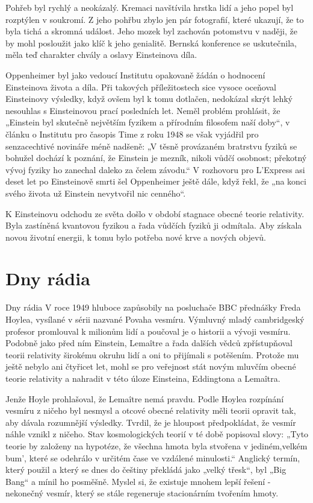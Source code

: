   Pohřeb byl rychlý a neokázalý. Kremaci navštívila hrstka lidí a jeho popel byl rozptýlen v
  soukromí. Z jeho pohřbu zbylo jen pár fotografií, které ukazují, že to byla tichá a skromná
  událost. Jeho mozek byl zachován potomstvu v naději, že by mohl posloužit jako klíč k jeho
  genialitě. Bernská konference se uskutečnila, měla teď charakter chvály a oslavy Einsteinova díla.
  
  Oppenheimer byl jako vedoucí Institutu opakovaně žádán o hodnocení Einsteinova života a díla. Při
  takových příležitostech sice vysoce oceňoval Einsteinovy výsledky, když ovšem byl k tomu dotlačen,
  nedokázal skrýt lehký nesouhlas s Einsteinovou prací posledních let. Neměl problém prohlásit, že
  „Einstein byl skutečně největším fyzikem a přírodním filosofem naší doby“, v článku o Institutu
  pro časopis Time z roku 1948 se však vyjádřil pro senzacechtivé novináře méně nadšeně: „V těsně
  provázaném bratrstvu fyziků se bohužel dochází k poznání, že Einstein je mezník, nikoli vůdčí
  osobnost; překotný vývoj fyziky ho zanechal daleko za čelem závodu.“ V rozhovoru pro L’Express asi
  deset let po Einsteinově smrti šel Oppenheimer ještě dále, když řekl, že „na konci svého života už
  Einstein nevytvořil nic cenného“. 
  
  K Einsteinovu odchodu ze světa došlo v období stagnace obecné teorie relativity. Byla zastíněná
  kvantovou fyzikou a řada vůdčích fyziků ji odmítala. Aby získala novou životní energii, k tomu
  bylo potřeba nové krve a nových objevů.

\section{Dny rádia}\label{feyIchIIIsecVII}
  Dny rádia V roce 1949 hluboce zapůsobily na posluchače BBC přednášky Freda Hoylea, vysílané v
  sérii nazvané Povaha vesmíru. Výmluvný mladý cambridgeský profesor promlouval k milionům lidí a
  poučoval je o historii a vývoji vesmíru. Podobně jako před ním Einstein, Lemaître a řada dalších
  vědců zpřístupňoval teorii relativity širokému okruhu lidí a oni to přijímali s potěšením. Protože
  mu ještě nebylo ani čtyřicet let, mohl se pro veřejnost stát novým mluvčím obecné teorie
  relativity a nahradit v této úloze Einsteina, Eddingtona a Lemaîtra. 

  Jenže Hoyle prohlašoval, že Lemaître nemá pravdu. Podle Hoylea rozpínání vesmíru z ničeho byl
  nesmysl a otcové obecné relativity měli teorii opravit tak, aby dávala rozumnější výsledky.
  Tvrdil, že je hloupost předpokládat, že vesmír náhle vznikl z ničeho. Stav kosmologických teorií v
  té době popisoval slovy: „Tyto teorie by založeny na hypotéze, že všechna hmota byla stvořena v
  jediném,velkém bum', které se odehrálo v určitém čase ve vzdálené minulosti.“ Anglický termín,
  který použil a který se dnes do češtiny překládá jako „velký třesk“, byl „Big Bang“ a mínil ho
  posměšně. Myslel si, že existuje mnohem lepší řešení - nekonečný vesmír, který se stále regeneruje
  stacionárním tvořením hmoty. 

